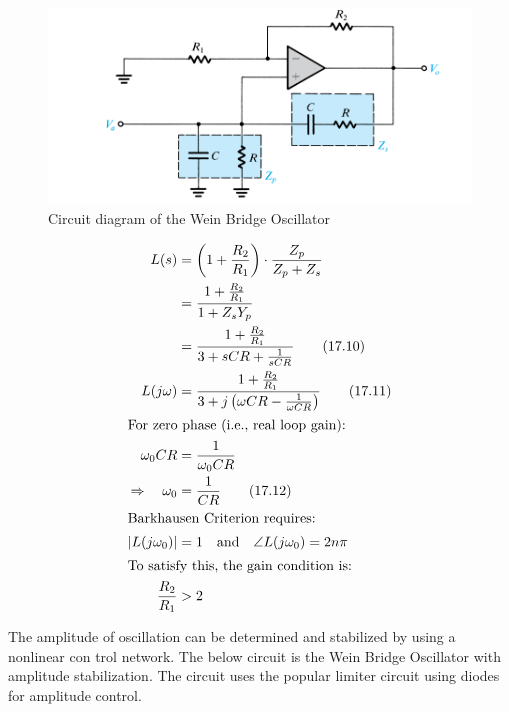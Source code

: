 \documentclass[conference]{IEEEtran}
\begin{document}
\begin{figure}
    \centering
    \includegraphics[width=1 \linewidth]{Images/Wein_bridge_osc_without_amp_stabilization.png}
    \caption{Circuit diagram of the Wein Bridge Oscillator}
\end{figure}

\begin{align}
    L(s) &= \left( 1 + \frac{R_2}{R_1} \right) 
            \cdot \frac{Z_p}{Z_p + Z_s} \nonumber \\
         &= \frac{1 + \tfrac{R_2}{R_1}}{1 + Z_s Y_p} \nonumber \\
         &= \frac{1 + \tfrac{R_2}{R_1}}{3 + sCR + \tfrac{1}{sCR}} \tag{17.10} \\
    L(j\omega) &= \frac{1 + \tfrac{R_2}{R_1}}
                      {3 + j\left( \omega CR - \tfrac{1}{\omega CR} \right)} \tag{17.11} \\
    \intertext{For zero phase (i.e., real loop gain):}
    \omega_0 CR &= \frac{1}{\omega_0 CR} \nonumber \\
    \Rightarrow \quad \omega_0 &= \frac{1}{CR} \tag{17.12} \\
    \intertext{Barkhausen Criterion requires:}
    |L(j\omega_0)| &= 1 \quad \text{and} \quad 
    \angle L(j\omega_0) = 2n\pi \\
    \intertext{To satisfy this, the gain condition is:}
    \frac{R_2}{R_1} &> 2 \nonumber
    \end{align}
    
    
    
The amplitude of oscillation can be determined and stabilized by using a nonlinear con
trol network. The below circuit is the Wein Bridge Oscillator with amplitude stabilization. The circuit uses the popular limiter circuit using diodes for amplitude control. 
\end{document}
